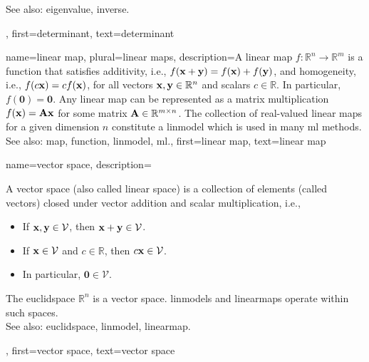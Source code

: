 {{\begin{figure}[H]
\begin{center}
	\end{center}
	\end{figure}
		See also: \gls{eigenvalue}, \gls{inverse}.},
	first={determinant},
	text={determinant}
}

{name={linear map}, plural={linear maps}, 
	description={A linear \gls{map} $f: \mathbb{R}^n \rightarrow \mathbb{R}^m$ is a \gls{function} that satisfies additivity, i.e.,
		$f({\bf x} + {\bf y}) = f({\bf x}) + f({\bf y})$, and homogeneity, i.e.,
		$f(c{\bf x}) = c f({\bf x})$, for all vectors ${\bf x}, {\bf y} \in \mathbb{R}^n$ and scalars $c \in \mathbb{R}$. 
		In particular, $f(\mathbf{0}) = \mathbf{0}$. Any linear \gls{map} can be represented as a matrix 
		multiplication $f({\bf x}) = {\bf A} {\bf x}$ for some matrix ${\bf A} \in \mathbb{R}^{m \times n}$. 
		The collection of real-valued linear \glspl{map} for a given dimension $n$ constitute a \gls{linmodel} 
		which is used in many \gls{ml} methods.\\
		See also: \gls{map}, \gls{function}, \gls{linmodel}, \gls{ml}.},
	first={linear map},
	text={linear map}
}


{name={vector space},
	description={A vector space (also called linear space) is a collection of elements (called vectors) closed under vector addition and scalar multiplication, i.e.,
		\begin{itemize}
			\item If ${\bf x}, {\bf y} \in \mathcal{V}$, then ${\bf x} + {\bf y} \in \mathcal{V}$.
			\item If ${\bf x} \in \mathcal{V}$ and $c \in \mathbb{R}$, then $c {\bf x} \in \mathcal{V}$.
			\item In particular, $\mathbf{0} \in \mathcal{V}$.
		\end{itemize}
		The \gls{euclidspace} $\mathbb{R}^n$ is a vector space.
		\Glspl{linmodel} and \glspl{linearmap} operate within such spaces.\\
		See also: \gls{euclidspace}, \gls{linmodel}, \gls{linearmap}.},
	first={vector space},
	text={vector space}
}


